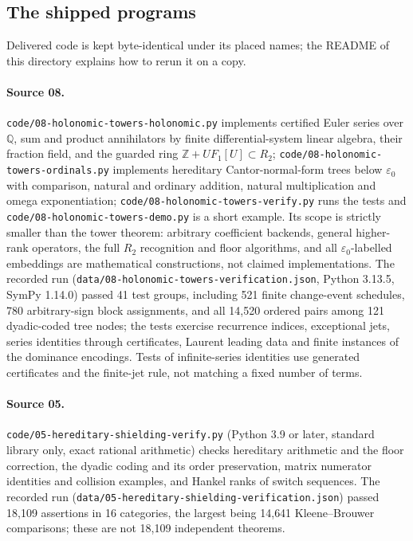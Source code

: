 \documentclass[11pt,oneside]{article}
\numberwithin{equation}{section}
\theoremstyle{definition}
\theoremstyle{remark}
\newcommand{\Z}{\mathbb Z}
\newcommand{\Q}{\mathbb Q}
\newcommand{\fn}[1]{\nolinkurl{#1}}
\begin{document}
\subsection{The shipped programs}

Delivered code is kept byte-identical under its placed names; the README of this
directory explains how to rerun it on a copy.

\paragraph{Source 08.} \fn{code/08-holonomic-towers-holonomic.py} implements
certified Euler series over $\Q$, sum and product annihilators by finite
differential-system linear algebra, their fraction field, and the guarded ring
$\Z+UF_1[U]\subset R_2$; \fn{code/08-holonomic-towers-ordinals.py} implements
hereditary Cantor-normal-form trees below $\varepsilon_0$ with comparison, natural
and ordinary addition, natural multiplication and omega exponentiation;
\fn{code/08-holonomic-towers-verify.py} runs the tests and
\fn{code/08-holonomic-towers-demo.py} is a short example. Its scope is strictly
smaller than the tower theorem: arbitrary coefficient backends, general
higher-rank operators, the full $R_2$ recognition and floor algorithms, and all
$\varepsilon_0$-labelled embeddings are mathematical constructions, not claimed
implementations. The recorded run (\fn{data/08-holonomic-towers-verification.json},
Python 3.13.5, SymPy 1.14.0) passed 41 test groups, including 521 finite
change-event schedules, 780 arbitrary-sign block assignments, and all 14{,}520
ordered pairs among 121 dyadic-coded tree nodes; the tests exercise recurrence
indices, exceptional jets, series identities through certificates, Laurent
leading data and finite instances of the dominance encodings. Tests of
infinite-series identities use generated certificates and the finite-jet rule,
not matching a fixed number of terms.

\paragraph{Source 05.} \fn{code/05-hereditary-shielding-verify.py} (Python 3.9 or
later, standard library only, exact rational arithmetic) checks hereditary
arithmetic and the floor correction, the dyadic coding and its order
preservation, matrix numerator identities and collision examples, and Hankel ranks
of switch sequences. The recorded run
(\fn{data/05-hereditary-shielding-verification.json}) passed 18{,}109 assertions
in 16 categories, the largest being 14{,}641 Kleene--Brouwer comparisons; these
are not 18{,}109 independent theorems.
\end{document}
